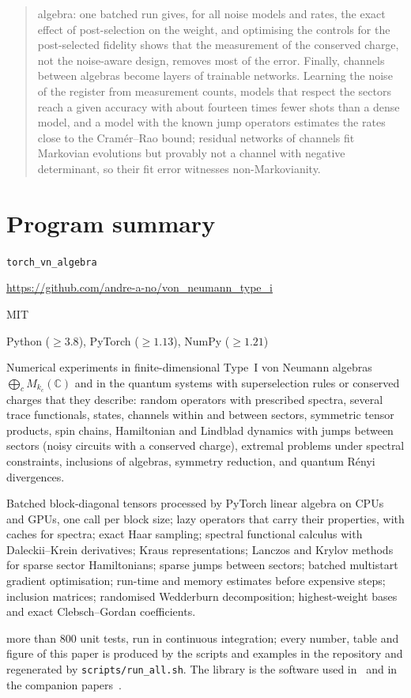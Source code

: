 \documentclass[11pt]{article}
\newcommand{\C}{\mathbb{C}}
\begin{document}
\begin{abstract}
algebra: one batched run gives, for all noise models and rates, the exact effect of post-selection on the weight, and
optimising the controls for the post-selected fidelity shows that the measurement of the conserved charge, not the
noise-aware design, removes most of the error. Finally, channels between algebras become layers of trainable networks. Learning
the noise of the register from measurement counts, models that respect the sectors reach a given accuracy with about
fourteen times fewer shots than a dense model, and a model with the known jump operators estimates the rates close to
the Cramér--Rao bound; residual networks of channels fit Markovian evolutions but provably not a channel with negative
determinant, so their fit error witnesses non-Markovianity.
\end{abstract}

\section*{Program summary}
\begin{description}\itemsep0pt
\item[Program title:] \texttt{torch\_vn\_algebra}
\item[Developer's repository link:] \url{https://github.com/andre-a-no/von_neumann_type_i}
\item[Licensing provisions:] MIT
\item[Programming language:] Python ($\ge3.8$), PyTorch ($\ge1.13$), NumPy ($\ge1.21$)
\item[Nature of problem:] Numerical experiments in finite-dimensional Type~I von Neumann algebras
$\bigoplus_cM_{k_c}(\C)$ and in the quantum systems with superselection rules or conserved charges that they describe:
random operators with prescribed spectra, several trace functionals, states, channels within and between sectors,
symmetric tensor products, spin chains, Hamiltonian and Lindblad dynamics with jumps between sectors (noisy circuits
with a conserved charge), extremal problems under spectral constraints, inclusions of algebras, symmetry reduction,
and quantum Rényi divergences.
\item[Solution method:] Batched block-diagonal tensors processed by PyTorch linear algebra on CPUs and GPUs, one
call per block size; lazy operators that carry their properties, with caches for spectra; exact Haar sampling;
spectral functional calculus with Daleckii--Krein derivatives; Kraus representations; Lanczos and Krylov methods for
sparse sector Hamiltonians; sparse jumps between sectors; batched multistart gradient optimisation; run-time and
memory estimates before expensive steps; inclusion matrices; randomised Wedderburn decomposition; highest-weight bases
and exact Clebsch--Gordan coefficients.
\item[Additional comments:] more than 800 unit tests, run in continuous integration; every number, table and figure of
this paper is produced by the scripts and examples in the repository and regenerated by \texttt{scripts/run\_all.sh}.
The library is the software used in~\cite{abed2024} and in the companion papers~\cite{nn_trace,nn_cs,nn_btc}.
\end{description}
\end{document}

